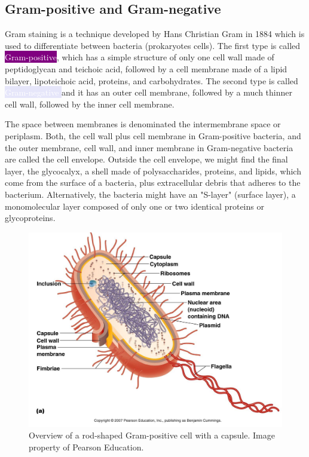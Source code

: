 \subsection{Gram-positive and Gram-negative}
\label{staph:gram-types}

Gram staining is a technique developed by Hans Christian Gram in 1884 which is used to differentiate between bacteria (prokaryotes cells). The first type is called \colorbox{Purple}{\textcolor{white}{Gram-positive}}, which has a simple structure of only one cell wall made of peptidoglycan and teichoic acid, followed by a cell membrane made of a lipid bilayer, lipoteichoic acid, proteins, and carbohydrates. The second type is called \colorbox{Lavender}{\textcolor{white}{ Gram-negative }} and it has an outer cell membrane, followed by a much thinner cell wall, followed by the inner cell membrane.

The space between membranes is denominated the intermembrane space or periplasm. Both, the cell wall plus cell membrane in Gram-positive bacteria, and the outer membrane, cell wall, and inner membrane in Gram-negative bacteria are called the cell envelope. Outside the cell envelope, we might find the final layer, the glycocalyx, a shell made of polysaccharides, proteins, and lipids, which come from the surface of a bacteria, plus extracellular debris that adheres to the bacterium. Alternatively, the bacteria might have an "S-layer" (surface layer), a monomolecular layer composed of only one or two identical proteins or glycoproteins.

    \begin{figure}[ht]
        \centering
            \includegraphics[width=0.7\linewidth]{figures/Staph/bacterialstructure.jpg}
            \caption{Overview of a rod-shaped Gram-positive cell with a capsule. Image property of Pearson Education.}
            \label{figure:capsule}
    \end{figure}

